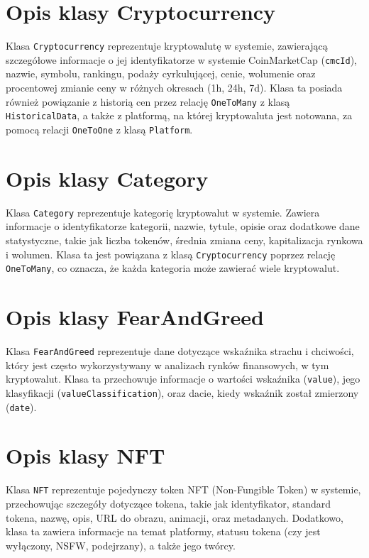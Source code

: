 \section{Opis klasy Cryptocurrency}

Klasa \texttt{Cryptocurrency} reprezentuje kryptowalutę w systemie, zawierającą szczegółowe informacje o jej identyfikatorze w systemie CoinMarketCap (\texttt{cmcId}), nazwie, symbolu, rankingu, podaży cyrkulującej, cenie, wolumenie oraz procentowej zmianie ceny w różnych okresach (1h, 24h, 7d). Klasa ta posiada również powiązanie z historią cen przez relację \texttt{OneToMany} z klasą \texttt{HistoricalData}, a także z platformą, na której kryptowaluta jest notowana, za pomocą relacji \texttt{OneToOne} z klasą \texttt{Platform}.

\section{Opis klasy Category}

Klasa \texttt{Category} reprezentuje kategorię kryptowalut w systemie. Zawiera informacje o identyfikatorze kategorii, nazwie, tytule, opisie oraz dodatkowe dane statystyczne, takie jak liczba tokenów, średnia zmiana ceny, kapitalizacja rynkowa i wolumen. Klasa ta jest powiązana z klasą \texttt{Cryptocurrency} poprzez relację \texttt{OneToMany}, co oznacza, że każda kategoria może zawierać wiele kryptowalut. 

\section{Opis klasy FearAndGreed}

Klasa \texttt{FearAndGreed} reprezentuje dane dotyczące wskaźnika strachu i chciwości, który jest często wykorzystywany w analizach rynków finansowych, w tym kryptowalut. Klasa ta przechowuje informacje o wartości wskaźnika (\texttt{value}), jego klasyfikacji (\texttt{valueClassification}), oraz dacie, kiedy wskaźnik został zmierzony (\texttt{date}).

\section{Opis klasy NFT}

Klasa \texttt{NFT} reprezentuje pojedynczy token NFT (Non-Fungible Token) w systemie, przechowując szczegóły dotyczące tokena, takie jak identyfikator, standard tokena, nazwę, opis, URL do obrazu, animacji, oraz metadanych. Dodatkowo, klasa ta zawiera informacje na temat platformy, statusu tokena (czy jest wyłączony, NSFW, podejrzany), a także jego twórcy.

